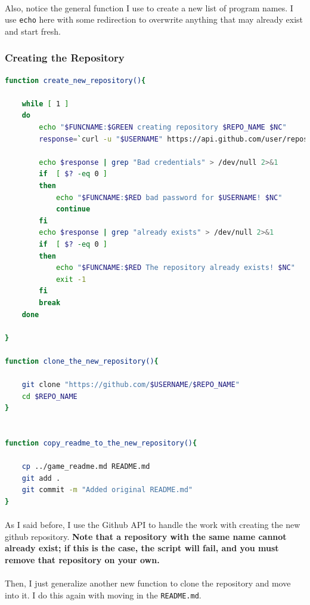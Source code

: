 \documentclass[11pt]{article}
\begin{document}
	\paragraph{} Also, notice the general function I use to create a new list of program names. I use \texttt{echo} here with some redirection to overwrite anything that may already exist and start fresh.

	\newpage

	\subsubsection{Creating the Repository}

	\begin{lstlisting}[language=bash]
function create_new_repository(){

	while [ 1 ]
	do
		echo "$FUNCNAME:$GREEN creating repository $REPO_NAME $NC"
		response=`curl -u "$USERNAME" https://api.github.com/user/repos -d "{\"name\":\"$REPO_NAME\"}"`

		echo $response | grep "Bad credentials" > /dev/null 2>&1
		if  [ $? -eq 0 ]
		then
			echo "$FUNCNAME:$RED bad password for $USERNAME! $NC"
			continue
		fi
		echo $response | grep "already exists" > /dev/null 2>&1
		if  [ $? -eq 0 ]
		then
			echo "$FUNCNAME:$RED The repository already exists! $NC"
			exit -1
		fi
		break
	done

}

function clone_the_new_repository(){

	git clone "https://github.com/$USERNAME/$REPO_NAME"
	cd $REPO_NAME
}


function copy_readme_to_the_new_repository(){

	cp ../game_readme.md README.md
	git add .
	git commit -m "Added original README.md"
}
	\end{lstlisting}

	\paragraph{} As I said before, I use the Github API to handle the work with creating the new github repository. \textbf{Note that a repository with the same name cannot already exist; if this is the case, the script will fail, and you must remove that repository on your own.}

	\paragraph{} Then, I just generalize another new function to clone the repository and move into it. I do this again with moving in the \texttt{README.md}.
\end{document}
